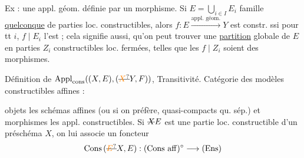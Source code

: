 Ex : une appl. géom. définie par un morphisme. Si  $E=\bigcup_{i\in I}E_i$ famille \uline{quelconque} de parties loc. constructibles, alors $f:E\xrightarrow{\text{appl. géom.}}Y$ est constr. ssi pour tt $i$, $f\mid E_i$ l'est ; cela signifie aussi,  qu'on peut trouver une \uline{partition} globale de $E$ en parties $Z_i$ constructibles loc. fermées, telles que les $f\mid Z_i$ soient des morphismes.

Définition de $\operatorname{Appl}_{\mathrm{cons}}((X,E),(\deleted{\unsure{X}}Y,F))$, Transitivité. Catégorie  des modèles constructibles affines :

objets les schémas affines (ou si on préfère, quasi-compacts qu. sép.) et morphismes les appl. constructibles. Si $\deleted{X}E$ est une partie loc.  constructible d'un préschéma $X$, on lui associe un foncteur
\[
\mathrm{Cons}\,(\deleted{\unsure{E}}X,E):(\mathrm{Cons}\ \mathrm{aff})^{\circ}\longrightarrow(\mathrm{Ens})
\]
